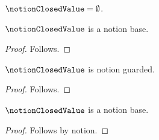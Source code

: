 

\begin{definition}\label{notion_closed_value}
    $\notionClosedValue=\emptyset$.
\end{definition}

\begin{classification}\label{notion_closed_value_base}
    $\notionClosedValue$ is a notion base.
\end{classification}
\begin{proof}
    Follows.
\end{proof}

\begin{proposition}\label{notion_closed_value_guarded}
    $\notionClosedValue$ is notion guarded.
\end{proposition}
\begin{proof}
    Follows.
\end{proof}

\begin{proposition}\label{notion_closed_value_replayed}
    $\notionClosedValue$ is a notion base.
\end{proposition}
\begin{proof}
    Follows by notion.
\end{proof}
